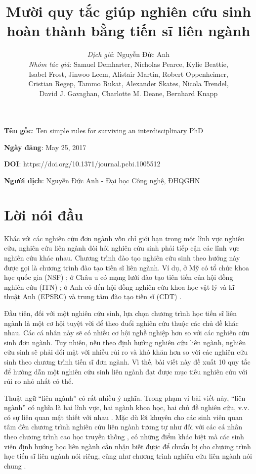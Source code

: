 \documentclass[12pt]{report}
\title{Mười quy tắc giúp nghiên cứu sinh \\hoàn thành bằng tiến sĩ liên ngành}
\author{\textit{Dịch giả}: Nguyễn Đức Anh
	\\ \textit{Nhóm tác giả}: Samuel Demharter, Nicholas Pearce, Kylie Beattie, \\Isabel Frost, Jinwoo Leem, Alistair Martin, Robert Oppenheimer, \\Cristian Regep, Tammo Rukat, Alexander Skates, Nicola Trendel, \\David J. Gavaghan, Charlotte M. Deane, Bernhard Knapp}
\date{}
\begin{document}
\maketitle

	

\textbf{Tên gốc}: Ten simple rules for surviving an interdisciplinary PhD

\textbf{Ngày đăng}: May 25, 2017

\textbf{DOI}: https://doi.org/10.1371/journal.pcbi.1005512

\textbf{Người dịch}: Nguyễn Đức Anh - Đại học Công nghệ, ĐHQGHN

\pagebreak

\tableofcontents

\pagebreak

\section{Lời nói đầu}

Khác với các nghiên cứu đơn ngành vốn chỉ giới hạn trong một lĩnh vực nghiên cứu, nghiên cứu liên ngành đòi hỏi nghiên cứu sinh phải tiếp cận các lĩnh vực nghiên cứu khác nhau. Chương trình đào tạo nghiên cứu sinh theo hướng này được gọi là chương trình đào tạo tiến sĩ liên ngành. Ví dụ, ở Mỹ có tổ chức khoa học quốc gia (NSF) \cite{1} \cite{2}; ở Châu  u có mạng lưới đào tạo tiên tiến của hội đồng nghiên cứu (ITN) \cite{3}; ở Anh có đến hội đồng nghiên cứu khoa học vật lý và kĩ thuật Anh (EPSRC) và trung tâm đào tạo tiến sĩ (CDT) \cite{4}.

Đầu tiên, đối với một nghiên cứu sinh, lựa chọn chương trình học tiến sĩ liên ngành là một cơ hội tuyệt vời để theo đuổi nghiên cứu thuộc các chủ đề khác nhau. Các cá nhân này sẽ có nhiều cơ hội nghề nghiệp hơn so với các nghiên cứu sinh đơn ngành. Tuy nhiên, nếu theo định hướng nghiên cứu liên ngành, nghiên cứu sinh sẽ phải đổi mặt với nhiều rủi ro và khó khăn hơn so với các nghiên cứu sinh theo chương trình tiến sĩ đơn ngành. Vì thế, bài viết này đề xuất 10 quy tắc để hướng dẫn một nghiên cứu sinh liên ngành đạt được mục tiêu nghiên cứu với rủi ro nhỏ nhất có thể.

Thuật ngữ “liên ngành” có rất nhiều ý nghĩa. Trong phạm vi bài viết này, “liên ngành” có nghĩa là hai lĩnh vực, hai ngành khoa học, hai chủ đề nghiên cứu, v.v. có sự liên quan mật thiết với nhau \cite{5}. Mặc dù lời khuyên cho các sinh viên quan tâm đến chương trình nghiên cứu liên ngành tương tự như đối với các cá nhân theo chương trình cao học truyền thống \cite{6}, có những điểm khác biệt mà các sinh viên định hướng học liên ngành cần nhận biết được để chuẩn bị cho chương trình học tiến sĩ liên ngành nói riêng, cũng như chương trình nghiên cứu liên ngành nói chung \cite{7}.
\end{document}
